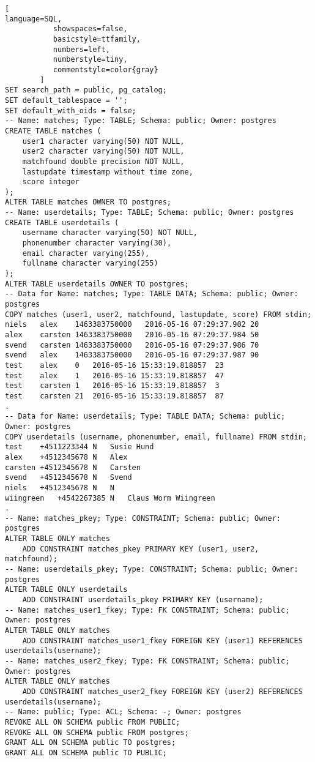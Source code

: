 \begin{lstlisting}[
language=SQL,
           showspaces=false,
           basicstyle=ttfamily,
           numbers=left,
           numberstyle=tiny,
           commentstyle=color{gray}
        ]
SET search_path = public, pg_catalog;
SET default_tablespace = '';
SET default_with_oids = false;
-- Name: matches; Type: TABLE; Schema: public; Owner: postgres
CREATE TABLE matches (
    user1 character varying(50) NOT NULL,
    user2 character varying(50) NOT NULL,
    matchfound double precision NOT NULL,
    lastupdate timestamp without time zone,
    score integer
);
ALTER TABLE matches OWNER TO postgres;
-- Name: userdetails; Type: TABLE; Schema: public; Owner: postgres
CREATE TABLE userdetails (
    username character varying(50) NOT NULL,
    phonenumber character varying(30),
    email character varying(255),
    fullname character varying(255)
);
ALTER TABLE userdetails OWNER TO postgres;
-- Data for Name: matches; Type: TABLE DATA; Schema: public; Owner: postgres
COPY matches (user1, user2, matchfound, lastupdate, score) FROM stdin;
niels   alex    1463383750000   2016-05-16 07:29:37.902 20
alex    carsten 1463383750000   2016-05-16 07:29:37.984 50
svend   carsten 1463383750000   2016-05-16 07:29:37.986 70
svend   alex    1463383750000   2016-05-16 07:29:37.987 90
test    alex    0   2016-05-16 15:33:19.818857  23
test    alex    1   2016-05-16 15:33:19.818857  47
test    carsten 1   2016-05-16 15:33:19.818857  3
test    carsten 21  2016-05-16 15:33:19.818857  87
.
-- Data for Name: userdetails; Type: TABLE DATA; Schema: public; Owner: postgres
COPY userdetails (username, phonenumber, email, fullname) FROM stdin;
test    +4511223344 N   Susie Hund
alex    +4512345678 N   Alex
carsten +4512345678 N   Carsten
svend   +4512345678 N   Svend
niels   +4512345678 N   N
wiingreen   +4542267385 N   Claus Worm Wiingreen
.
-- Name: matches_pkey; Type: CONSTRAINT; Schema: public; Owner: postgres
ALTER TABLE ONLY matches
    ADD CONSTRAINT matches_pkey PRIMARY KEY (user1, user2, matchfound);
-- Name: userdetails_pkey; Type: CONSTRAINT; Schema: public; Owner: postgres
ALTER TABLE ONLY userdetails
    ADD CONSTRAINT userdetails_pkey PRIMARY KEY (username);
-- Name: matches_user1_fkey; Type: FK CONSTRAINT; Schema: public; Owner: postgres
ALTER TABLE ONLY matches
    ADD CONSTRAINT matches_user1_fkey FOREIGN KEY (user1) REFERENCES userdetails(username);
-- Name: matches_user2_fkey; Type: FK CONSTRAINT; Schema: public; Owner: postgres
ALTER TABLE ONLY matches
    ADD CONSTRAINT matches_user2_fkey FOREIGN KEY (user2) REFERENCES userdetails(username);
-- Name: public; Type: ACL; Schema: -; Owner: postgres
REVOKE ALL ON SCHEMA public FROM PUBLIC;
REVOKE ALL ON SCHEMA public FROM postgres;
GRANT ALL ON SCHEMA public TO postgres;
GRANT ALL ON SCHEMA public TO PUBLIC;
\end{lstlisting}